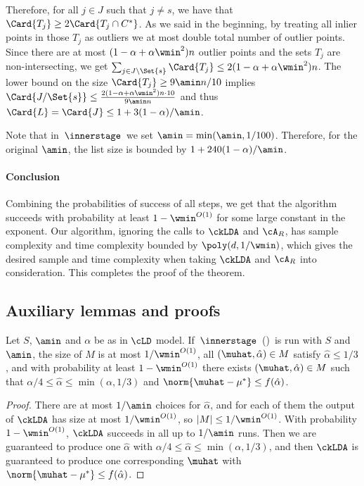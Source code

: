 Therefore, for all \(j \in J\) such that \(j \neq s\), we have that \(\Card{T_j} \geq 2\Card{T_j \cap C^{\ast}}\).
As we said in the beginning, by treating all inlier points in those \(T_j\) as outliers we at most double total number of outlier points.
Since there are at most \((1 - \alpha+\alpha\wmin^2)n\) outlier points and the sets \(T_j\) are non-intersecting, 
we get \(\sum_{j \in J \setminus \Set{s}} \Card{T_j} \leq 2(1 - \alpha + \alpha\wmin^2)n\).
The lower bound on the size \(\Card{T_j} \geq 9 \amin n / 10\) implies 
\(\Card{J / \Set{s}} \leq \frac{2(1 - \alpha+\alpha\wmin^2)n \cdot 10}{9\amin n}\)
and thus \(\Card{L} = \Card{J} \leq 1 + 3(1 - \alpha) / \amin\). 

Note that in~\(\innerstage\)~we set \(\amin = \min(\amin, 1/100)\).
Therefore, for the original $\amin$, the list size is bounded by $1 + 240(1-\alpha)/\amin$.

\paragraph{Conclusion}
Combining the probabilities of success of all steps, we get that the algorithm succeeds with probability at least $1-\wmin^{O(1)}$ for some large constant in the exponent.
Our algorithm, ignoring the calls to $\ckLDA$ and $\cA_{R}$, has sample complexity and time complexity bounded by $\poly(d, 1/\wmin)$, which gives the desired sample and time complexity when taking $\ckLDA$ and $\cA_R$ into consideration. 
This completes the proof of the theorem.

\subsection{Auxiliary lemmas and proofs}
\begin{lemma}
    \label{lemma:list_init}
    Let \(S\), \(\amin\) and \(\alpha\) be as in \(\cLD\) model. If~\(\innerstage\)~()~is run with \(S\) and \(\amin\), the size of $M$ is at most $1/\wmin^{O(1)}$, all $(\muhat, \hat\alpha) \in M$ satisfy $\hat\alpha \leq 1/3$, and with probability  at least \(1 - \wmin^{O(1)}\) 
    there exists \((\muhat, \hat \alpha) \in M\) such that $\alpha/4 \leq \hat\alpha \leq \min(\alpha, 1/3)$ and $\norm{\muhat-\mu^*} \leq f(\hat\alpha)$.
\end{lemma}
\begin{proof}
There are at most $1/\amin$ choices for $\hat\alpha$, and for each of them the output of $\ckLDA$ has size at most $1/\wmin^{O(1)}$, so $|M| \leq 1/\wmin^{O(1)}$.
With probability $1-\wmin^{O(1)}$, $\ckLDA$ succeeds in all up to $1/\amin$ runs. Then we are guaranteed to produce one $\hat\alpha$ with $\alpha/4 \leq \hat\alpha \leq \min(\alpha, 1/3)$, and then $\ckLDA$ is guaranteed to produce one corresponding $\muhat$ with $\norm{\muhat - \mu^*} \leq f(\hat\alpha)$.
\end{proof}


